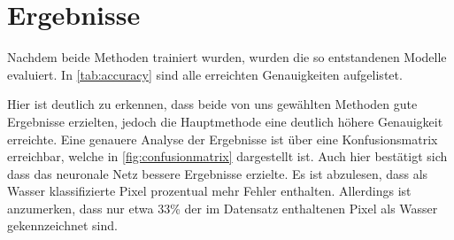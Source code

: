 \section{Ergebnisse}
\label{sec:Ergebnisse}

Nachdem beide Methoden trainiert wurden, wurden die so entstandenen Modelle evaluiert.
In \autoref{tab:accuracy} sind alle erreichten Genauigkeiten aufgelistet.

\begin{table}
    \centering
    \caption{Genauigkeit der verwendeten Methoden auf den verschiedenen Teildatensätzen, wobei mit CNN das Convolutional Neural Network gemeint ist}
    \label{tab:accuracy}
\end{table}

Hier ist deutlich zu erkennen, dass beide von uns gewählten Methoden gute Ergebnisse erzielten, jedoch die Hauptmethode eine deutlich höhere Genauigkeit erreichte.
Eine genauere Analyse der Ergebnisse ist über eine Konfusionsmatrix erreichbar, welche in \autoref{fig:confusionmatrix} dargestellt ist.
Auch hier bestätigt sich dass das neuronale Netz bessere Ergebnisse erzielte.
Es ist abzulesen, dass als Wasser klassifizierte Pixel prozentual mehr Fehler enthalten. 
Allerdings ist anzumerken, dass nur etwa 33\% der im Datensatz enthaltenen Pixel als Wasser gekennzeichnet sind.

